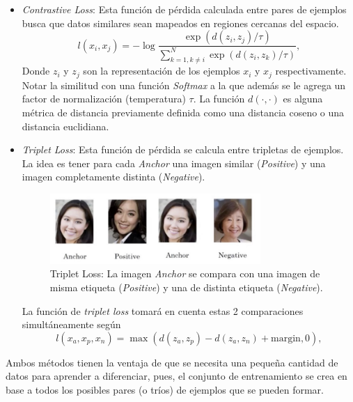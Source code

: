 \begin{itemize}
    \item \textit{Contrastive Loss}: Esta función de pérdida calculada entre pares de ejemplos busca que datos similares sean mapeados en regiones cercanas del espacio.
    \[
    l(x_i , x_j) = -\log\frac{\exp(d(z_i , z_j)/\tau)}{\sum_{k=1 , k \neq i}^N \exp(d(z_i , z_k)/\tau)} , 
    \]
    Donde $z_i$ y $z_j$ son la representación de los ejemplos $x_i$ y $x_j$ respectivamente. Notar la similitud con una función \textit{Softmax} a la que además se le agrega un factor de normalización (temperatura) $\tau$. La función $d(\cdot, \cdot)$ es alguna métrica de distancia previamente  definida como una distancia coseno o una distancia euclidiana. 
    
    \item \textit{Triplet Loss}: Esta función de pérdida se calcula entre tripletas de ejemplos. La idea es tener para cada \textit{Anchor} una imagen similar (\textit{Positive}) y una imagen completamente distinta (\textit{Negative}).
    
    \begin{figure}[h]
    \centering
    \includegraphics[width=8cm]{img/tesis/triplet_loss.jpeg}
    \caption{Triplet Loss: La imagen \textit{Anchor} se compara con una imagen de misma etiqueta (\textit{Positive}) y una de distinta etiqueta (\textit{Negative}).}
    \label{fig:triplet_loss}
    \end{figure}
    
    \noindent La función de \textit{triplet loss} tomará en cuenta estas 2 comparaciones simultáneamente según
    \[
    l(x_a , x_p, x_n) = \max(d(z_a, z_p) - d(z_a, z_n) + \text{margin} , 0) , 
    \]
    
    
\end{itemize}

Ambos métodos tienen la ventaja de que se necesita una pequeña cantidad de datos para aprender a diferenciar, pues, el conjunto de entrenamiento se crea en base a todos los posibles pares (o tríos) de ejemplos que se pueden formar.






